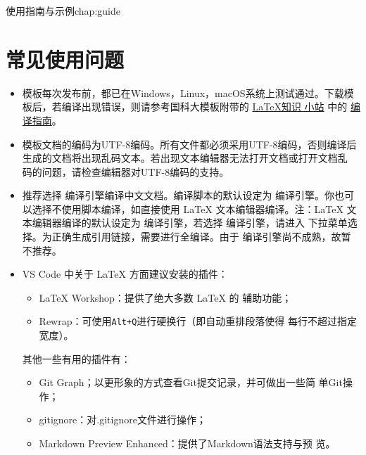 \begin{cuzchapter}{使用指南与示例}{chap:guide}
    \section{常见使用问题}\label{sec:qa}

    \begin{itemize}
        \item 模板每次发布前，都已在Windows，Linux，macOS系统上测试通过。下载模
              板后，若编译出现错误，则请参考国科大模板附带的
              \href{https://github.com/mohuangrui/ucasthesis/wiki}{\LaTeX{}知识
                  小站} 中的
              \href{https://github.com/mohuangrui/ucasthesis/wiki/%E7%BC%96%E8%AF%91%E6%8C%87%E5%8D%97}{编
                  译指南}。
        \item 模板文档的编码为UTF-8编码。所有文件都必须采用UTF-8编码，否则编译后
              生成的文档将出现乱码文本。若出现文本编辑器无法打开文档或打开文档乱
              码的问题，请检查编辑器对UTF-8编码的支持。
        \item 推荐选择  编译引擎编译中文文档。编译脚本的默认设定为
               编译引擎。你也可以选择不使用脚本编译，如直接使用
              \LaTeX{} 文本编辑器编译。注：\LaTeX{} 文本编辑器编译的默认设定为
               编译引擎，若选择  编译引擎，请进入
              下拉菜单选择。为正确生成引用链接，需要进行全编译。由于
               编译引擎尚不成熟，故暂不推荐。
        \item VS Code 中关于 \LaTeX{} 方面建议安装的插件：
              \begin{itemize}
                  \item \LaTeX{} Workshop：提供了绝大多数 \LaTeX{} 的
                        辅助功能；
                  \item Rewrap：可使用\verb|Alt+Q|进行硬换行（即自动重排段落使得
                        每行不超过指定宽度）。
              \end{itemize}
              其他一些有用的插件有：
              \begin{itemize}
                  \item Git Graph；以更形象的方式查看Git提交记录，并可做出一些简
                        单Git操作；
                  \item gitignore：对.gitignore文件进行操作；
                  \item Markdown Preview Enhanced：提供了Markdown语法支持与预
                        览。
              \end{itemize}

\end{itemize}
\end{cuzchapter}
